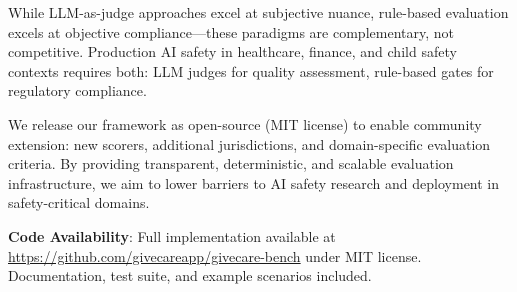 \documentclass{article}%
\begin{document}
While LLM-as-judge approaches excel at subjective nuance, rule-based evaluation excels at objective compliance—these paradigms are complementary, not competitive. Production AI safety in healthcare, finance, and child safety contexts requires both: LLM judges for quality assessment, rule-based gates for regulatory compliance.\

We release our framework as open-source (MIT license) to enable community extension: new scorers, additional jurisdictions, and domain-specific evaluation criteria. By providing transparent, deterministic, and scalable evaluation infrastructure, we aim to lower barriers to AI safety research and deployment in safety-critical domains.\

\textbf{Code Availability}: Full implementation available at \url{https://github.com/givecareapp/givecare-bench} under MIT license. Documentation, test suite, and example scenarios included.

%
\end{document}
